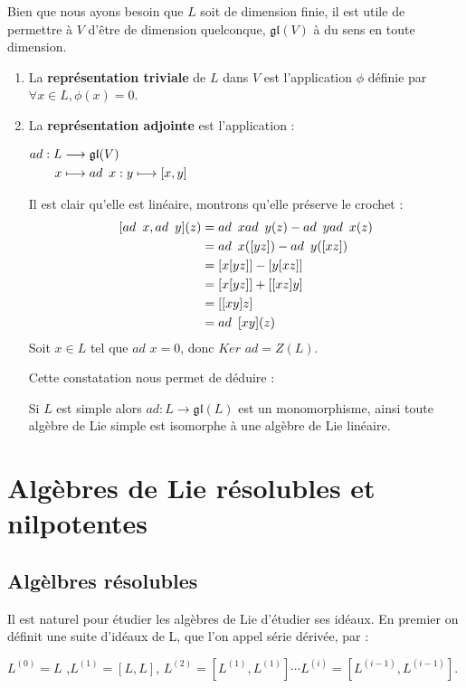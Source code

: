 \documentclass[a4paper,openany,12pt]{report}
\newcommand{\gl}{\mathfrak{gl}}
\theoremstyle{break}
{\theorembodyfont{\upshape}
\newtheorem*{rmq}{Remarque :}
\newtheorem*{prv}{Preuve :}
\newtheorem*{ex}{Exemples :}
\newtheorem{exe}{Exemple : }
\newtheorem*{nota}{Notation :}}
\begin{document}
Bien que nous ayons besoin que $L$ soit de dimension finie, il est utile de permettre à $V$ d'être de dimension quelconque, $\gl(V)$ à du sens en toute dimension.
\begin{ex}
\begin{enumerate}

\item La \textbf{représentation triviale} de $L$ dans $V$ est l'application $\phi$ définie par $\forall x \in L , \phi(x)=0$.

\item La \textbf{représentation adjointe} est l'application :
\begin{center}
$
\begin{aligned}
ad : L & \longrightarrow \gl(V) \\
x & \longmapsto ad \enskip x : y\longmapsto [x,y]
\end{aligned}$
\end{center}
Il est clair qu'elle est linéaire, montrons qu'elle préserve le crochet :
\[
\begin{aligned}
[ad \enskip x, ad \enskip y](z) & = ad \enskip x ad \enskip y(z)- ad \enskip y ad \enskip x(z) \\
& = ad \enskip x([y z])-ad \enskip y([x z]) \\
& = [x[y z]]-[y[x z]] \\
& = [x[y z]]+[[x z] y] \\
& = [[x y] z] \\
& = ad \enskip [x y](z)
\end{aligned} \]
Soit $x \in L$ tel que $ad$ $x=0$, donc $Ker$ $ad = Z(L)$. 

Cette constatation nous permet de déduire :

\quad Si $L$ est simple alors $ad: L \longrightarrow \gl(L)$ est un monomorphisme, ainsi toute algèbre de Lie simple est isomorphe à une algèbre de Lie linéaire.
\end{enumerate}
\end{ex}

\section{Algèbres de Lie résolubles et nilpotentes}

\subsection{Algèlbres résolubles}

\quad Il est naturel pour étudier les algèbres de Lie d'étudier ses idéaux. En premier on définit une suite d'idéaux de L, que l'on appel série dérivée, par :
\begin{center}
$L^{(0)} = L$ ,$L^{(1)} = [L,L]$, $L^{(2)} = [L^{(1)},L^{(1)}] \cdots L^{(i)} = [L^{(i-1)},L^{(i-1)}]$.
\end{center}
\end{document}

